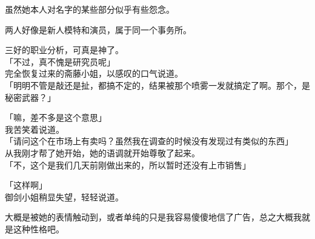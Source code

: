 虽然她本人对名字的某些部分似乎有些怨念。

两人好像是新人模特和演员，属于同一个事务所。

三好的职业分析，可真是神了。\\

「不过，真不愧是研究员呢」\\

完全恢复过来的斋藤小姐，以感叹的口气说道。\\

「明明不管是敲还是扯，都搞不定的，结果被那个喷雾一发就搞定了啊。那个，是秘密武器？」

「嘛，差不多是这个意思」\\

我苦笑着说道。\\

「请问这个在市场上有卖吗？虽然我在调查的时候没有发现过有类似的东西」\\

从我刚才帮了她开始，她的语调就开始尊敬了起来。\\

「不，这个是我们几天前刚做出来的，所以暂时还没有上市销售」

「这样啊」\\

御剑小姐稍显失望，轻轻说道。

大概是被她的表情触动到，或者单纯的只是我容易傻傻地信了广告，总之大概我就是这种性格吧。\\

